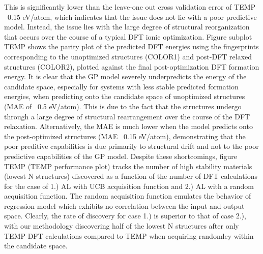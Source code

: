 %
This is significantly lower than the leave-one out cross validation error of TEMP ~0.15 eV/atom, which indicates that the issue does not lie with a poor predictive model.
%
Instead, the issue lies with the large degree of structural reorganization that occurs over the course of a typical DFT ionic optimization.
%
Figure subplot TEMP shows the parity plot of the predicted DFT energies using the fingerprints corresponding to the unoptimized structures (COLOR1) and post-DFT relaxed structures (COLOR2),
plotted against the final post-optimization DFT formation energy.
It is clear that the GP model severely underpredicts the energy of the candidate space, especially for systems with less stable predicted formation energies, when predicting onto the candidate space of unoptimized structures (MAE of ~0.5 eV/atom).
%
This is due to the fact that the structures undergo through a large degree of structural rearrangement over the course of the DFT relaxation.
%
Alternatively, the MAE is much lower when the model predicts onto the post-optimized structures (MAE ~0.15 eV/atom),
demonstrating that the poor preditive capabilities is due primarily to structural drift and not to the poor predictive capabilities of the GP model.
%
Despite these shortcomings, figure TEMP (TEMP performance plot) tracks the number of high stability materials (lowest N structures) discovered as a function of the number of DFT calculations for the case of 1.) AL with UCB acquisition function and 2.) AL with a random acquisition function.
%
The random acquisition function emulates the behavior of regression model which exhibits no correlation between the input and output space.
%
Clearly, the rate of discovery for case 1.) is superior to that of case 2.), with our methodology discovering half of the lowest N structures after only TEMP DFT calculations compared to TEMP when acquiring randomley within the candidate space.


